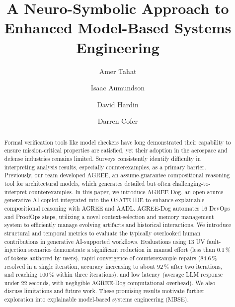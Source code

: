\documentclass{llncs}
\begin{document}
%
\title{A Neuro-Symbolic Approach to Enhanced Model-Based Systems Engineering}%
%
%
\author{Amer Tahat\and
  Isaac Aumundson \and
  David Hardin \and
  Darren Cofer}
%
%
%

\maketitle

\begin{abstract}
Formal verification tools like model checkers have long demonstrated their capability to ensure mission-critical properties are satisfied, yet their adoption in the aerospace and defense industries remains limited. Surveys consistently identify difficulty in interpreting analysis results, especially counterexamples, as a primary barrier. Previously, our team developed AGREE, an assume-guarantee compositional reasoning tool for architectural models, which generates detailed but often challenging-to-interpret counterexamples.
%
In this paper, we introduce AGREE-Dog, an open-source generative AI copilot integrated into the OSATE IDE to enhance explainable compositional reasoning with AGREE and AADL. AGREE-Dog automates 16 DevOps and ProofOps steps, utilizing a novel context-selection and memory management system to efficiently manage evolving artifacts and historical interactions.
%
We introduce structural and temporal metrics to evaluate the typically overlooked human contributions in generative AI-supported workflows. Evaluations using 13 UV fault-injection scenarios demonstrate a significant reduction in manual effort (less than 0.1\,\% of tokens authored by users), rapid convergence of counterexample repairs (84.6\,\% resolved in a single iteration, accuracy increasing to about 92\,\% after two iterations, and reaching 100\,\% within three iterations), and low latency (average LLM response under 22 seconds, with negligible AGREE-Dog computational overhead). We also discuss limitations and future work. These promising results motivate further exploration into explainable model-based systems engineering (MBSE).
\end{abstract}
\end{document}
